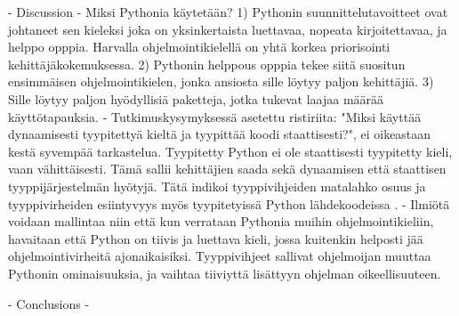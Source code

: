 \begin{otherlanguage}{finnish}
- Discussion
    - Miksi Pythonia käytetään? 1) Pythonin suunnittelutavoitteet ovat johtaneet sen kieleksi joka on yksinkertaista luettavaa, nopeata kirjoitettavaa, ja helppo opppia. Harvalla ohjelmointikielellä on yhtä korkea priorisointi kehittäjäkokemuksessa. 2) Pythonin helppous opppia tekee siitä suositun ensimmäisen ohjelmointikielen, jonka ansiosta sille löytyy paljon kehittäjiä. 3) Sille löytyy paljon hyödyllisiä paketteja, jotka tukevat laajaa määrää käyttötapauksia.
    - Tutkimuskysymyksessä asetettu ristiriita: "Miksi käyttää dynaamisesti tyypitettyä kieltä ja tyypittää koodi staattisesti?", ei oikeastaan kestä syvempää tarkastelua. Tyypitetty Python ei ole staattisesti tyypitetty kieli, vaan vähittäisesti. Tämä sallii kehittäjien saada sekä dynaamisen että staattisen tyyppijärjestelmän hyötyjä. Tätä indikoi tyyppivihjeiden matalahko osuus ja tyyppivirheiden esiintyvyys myös tyypitetyissä Python lähdekoodeissa \cite{di_grazia_evolution_2022, rak-amnouykit_taleoftwo_2020}.
    - Ilmiötä voidaan mallintaa niin että kun verrataan Pythonia muihin ohjelmointikieliin, havaitaan että Python on tiivis ja luettava kieli, jossa kuitenkin helposti jää ohjelmointivirheitä ajonaikaisiksi. Tyyppivihjeet sallivat ohjelmoijan muuttaa Pythonin ominaisuuksia, ja vaihtaa tiiviyttä lisättyyn ohjelman oikeellisuuteen.

- Conclusions
    -

\end{otherlanguage}
